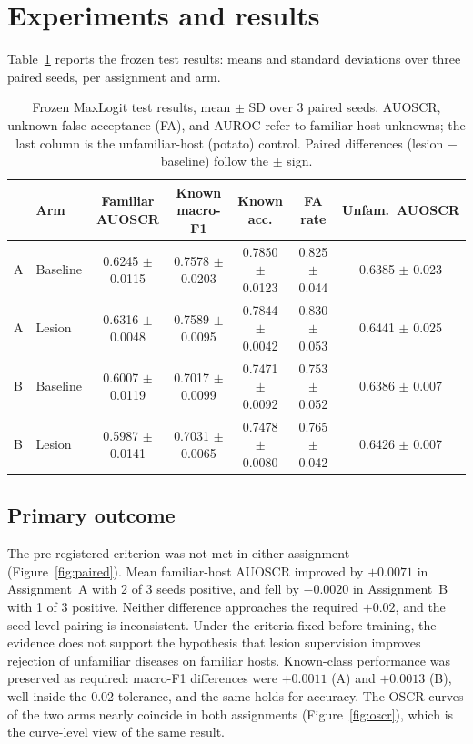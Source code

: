 \documentclass[10pt,a4paper]{article}
\begin{document}
\section{Experiments and results}
Table~\ref{tab:main} reports the frozen test results: means and standard deviations over three paired
seeds, per assignment and arm.

\begin{table}[t]
\centering
\caption{Frozen MaxLogit test results, mean $\pm$ SD over 3 paired seeds. AUOSCR, unknown false
acceptance (FA), and AUROC refer to familiar-host unknowns; the last column is the unfamiliar-host
(potato) control. Paired differences (lesion $-$ baseline) follow the $\pm$ sign.}
\label{tab:main}
\small
\begin{tabular}{llccccc}
\toprule
 & Arm & Familiar AUOSCR & Known macro-F1 & Known acc. & FA rate & Unfam.\ AUOSCR \\
\midrule
A & Baseline & 0.6245 $\pm$ 0.0115 & 0.7578 $\pm$ 0.0203 & 0.7850 $\pm$ 0.0123 & 0.825 $\pm$ 0.044 & 0.6385 $\pm$ 0.023 \\
A & Lesion   & 0.6316 $\pm$ 0.0048 & 0.7589 $\pm$ 0.0095 & 0.7844 $\pm$ 0.0042 & 0.830 $\pm$ 0.053 & 0.6441 $\pm$ 0.025 \\
B & Baseline & 0.6007 $\pm$ 0.0119 & 0.7017 $\pm$ 0.0099 & 0.7471 $\pm$ 0.0092 & 0.753 $\pm$ 0.052 & 0.6386 $\pm$ 0.007 \\
B & Lesion   & 0.5987 $\pm$ 0.0141 & 0.7031 $\pm$ 0.0065 & 0.7478 $\pm$ 0.0080 & 0.765 $\pm$ 0.042 & 0.6426 $\pm$ 0.007 \\
\bottomrule
\end{tabular}
\end{table}

\subsection{Primary outcome}
The pre-registered criterion was not met in either assignment
(Figure~\ref{fig:paired}). Mean familiar-host AUOSCR improved by $+0.0071$ in Assignment~A with 2 of 3
seeds positive, and fell by $-0.0020$ in Assignment~B with 1 of 3 positive. Neither difference approaches
the required $+0.02$, and the seed-level pairing is inconsistent. Under the criteria fixed before
training, the evidence does not support the hypothesis that lesion supervision improves rejection of
unfamiliar diseases on familiar hosts. Known-class performance was preserved as required: macro-F1
differences were $+0.0011$ (A) and $+0.0013$ (B), well inside the 0.02 tolerance, and the same holds for
accuracy. The OSCR curves of the two arms nearly coincide in both assignments
(Figure~\ref{fig:oscr}), which is the curve-level view of the same result.
\end{document}
